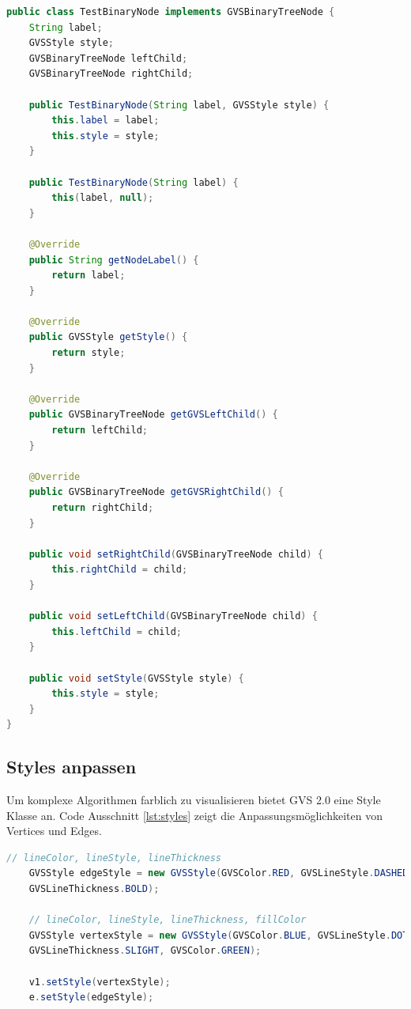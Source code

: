 \documentclass[11pt,a4paper,english,oneside]{book}
\numberwithin{equation}{chapter}
\begin{document}
\begin{lstlisting}[language=java, frame=single, caption={Binary Node Implementierung}, label={lst:binarynode-impl}]
public class TestBinaryNode implements GVSBinaryTreeNode {
	String label;
	GVSStyle style;
	GVSBinaryTreeNode leftChild;
	GVSBinaryTreeNode rightChild;
	
	public TestBinaryNode(String label, GVSStyle style) {
		this.label = label;
		this.style = style;
	}
	
	public TestBinaryNode(String label) {
		this(label, null);
	}
	
	@Override
	public String getNodeLabel() {
		return label;
	}
	
	@Override
	public GVSStyle getStyle() {
		return style;
	}
	
	@Override
	public GVSBinaryTreeNode getGVSLeftChild() {
		return leftChild;
	}
	
	@Override
	public GVSBinaryTreeNode getGVSRightChild() {
		return rightChild;
	}
	
	public void setRightChild(GVSBinaryTreeNode child) {
		this.rightChild = child;
	}
	
	public void setLeftChild(GVSBinaryTreeNode child) {
		this.leftChild = child;
	}
	
	public void setStyle(GVSStyle style) {
		this.style = style;
	}
}
\end{lstlisting}

	\clearpage
	
	\subsection{Styles anpassen}
	Um komplexe Algorithmen farblich zu visualisieren bietet GVS 2.0 eine Style Klasse an. Code Ausschnitt  \ref{lst:styles} zeigt die Anpassungsmöglichkeiten von Vertices und Edges.
	
	\begin{lstlisting}[language=java, frame=single, caption={Styles verändern}, label={lst:styles}]
	// lineColor, lineStyle, lineThickness
	GVSStyle edgeStyle = new GVSStyle(GVSColor.RED, GVSLineStyle.DASHED,
	GVSLineThickness.BOLD);
	
	// lineColor, lineStyle, lineThickness, fillColor
	GVSStyle vertexStyle = new GVSStyle(GVSColor.BLUE, GVSLineStyle.DOTTED,
	GVSLineThickness.SLIGHT, GVSColor.GREEN);
	
	v1.setStyle(vertexStyle);
	e.setStyle(edgeStyle);
	\end{lstlisting}
	
\end{document}
